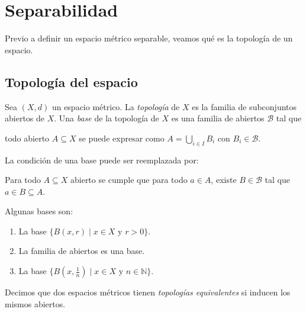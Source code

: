 \chapter{Separabilidad}

Previo a definir un espacio métrico separable, veamos qué es la topología de un espacio.

\section{Topología del espacio}

\begin{definition}
	Sea $(X, d)$ un espacio métrico. La \emph{topología} de $X$ es la familia de subconjuntos abiertos de $X$. Una \emph{base} de la topología de $X$ es una familia de abiertos $\mathcal{B}$ tal que
	\begin{center}
		\begin{minipage}{0.9\linewidth}
			todo abierto $A \subseteq X$ se puede expresar como $A = \bigcup_{i \in I} B_i$ con $B_i \in \mathcal{B}$.
		\end{minipage}
	\end{center}
\end{definition}
\begin{remark}
	La condición de una base puede ser reemplazada por:
	\begin{center}
		\begin{minipage}{0.9\linewidth}
			Para todo $A \subseteq X$ abierto se cumple que para todo $a \in A$, existe $B \in \mathcal{B}$ tal que $a \in B \subseteq A$.
		\end{minipage}
	\end{center}
\end{remark}

\begin{example}
	Algunas bases son:
	\begin{enumerate}
		\item La base $\{ B(x, r) \mid x \in X \text{ y } r > 0 \}$.
		\item La familia de abiertos es una base.
		\item La base $\{ B(x, \frac{1}{n}) \mid x \in X \text{ y } n \in \mathbb{N} \}$.
	\end{enumerate}
\end{example}

\begin{definition}
	Decimos que dos espacios métricos tienen \emph{topologías equivalentes} si inducen los mismos abiertos.
\end{definition}

